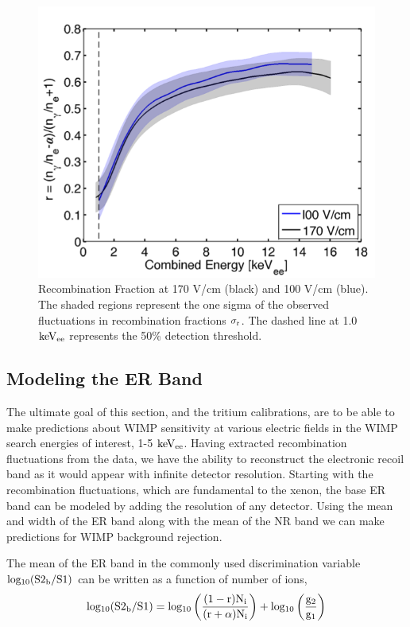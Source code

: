 \begin{figure}[h!]\centering
\includegraphics[width=120mm]{Chapter_Flucs/Figures/Iter1_100/R_comp.png}
\caption{Recombination Fraction at 170 V/cm (black) and 100 V/cm (blue). The shaded regions represent the one sigma of the observed fluctuations in recombination fractions $\rm \sigma_r$. The dashed line at 1.0 $\rm keV_{ee}$ represents the 50\% detection threshold.}
\label{fig:R_T}
\end{figure}

\newpage

\subsection{Modeling the ER Band}

The ultimate goal of this section, and the tritium calibrations, are to be able to make predictions about WIMP sensitivity at various electric fields in the WIMP search energies of interest, 1-5 $\rm keV_{ee}$. Having extracted recombination fluctuations from the data, we have the ability to reconstruct the electronic recoil band as it would appear with infinite detector resolution. Starting with the recombination fluctuations, which are fundamental to the xenon, the base ER band can be modeled by adding the resolution of any detector. Using the mean and width of the ER band along with the mean of the NR band we can make predictions for WIMP background rejection.  

The mean of the ER band in the commonly used discrimination variable $\rm  log_{10}(S2_b/S1)$ can be written as a function of number of ions,
\begin{equation}
\rm log_{10}(S2_b/S1) = log_{10} \left(\frac{(1-r)N_i}{(r+\alpha)N_i}\right) + log_{10}\left(\frac{g_2}{g_1}\right)
\label{eq:Band_Mean}
\end{equation}

